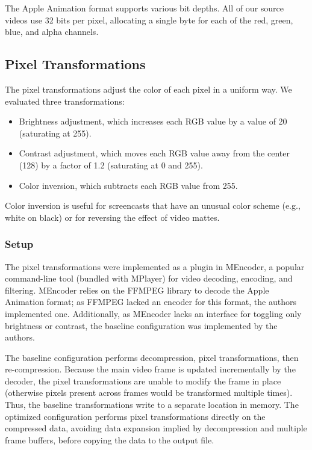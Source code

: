 The Apple Animation format supports various bit depths.  All of our
source videos use 32 bits per pixel, allocating a single byte for each
of the red, green, blue, and alpha channels.

\subsection{Pixel Transformations}

The pixel transformations adjust the color of each pixel in a uniform
way.  We evaluated three transformations:
\begin{itemize}
\item Brightness adjustment, which increases each RGB value by a value
of 20 (saturating at 255).
\item Contrast adjustment, which moves each RGB value away from the
center (128) by a factor of 1.2 (saturating at 0 and 255).
\item Color inversion, which subtracts each RGB value from 255.
\end{itemize}
Color inversion is useful for screencasts that have an unusual color
scheme (e.g., white on black) or for reversing the effect of video
mattes.

\subsubsection{Setup}

The pixel transformations were implemented as a plugin in MEncoder, a
popular command-line tool (bundled with MPlayer) for video decoding,
encoding, and filtering.  MEncoder relies on the FFMPEG library to
decode the Apple Animation format; as FFMPEG lacked an encoder for
this format, the authors implemented one.  Additionally, as MEncoder
lacks an interface for toggling only brightness or contrast, the
baseline configuration was implemented by the authors.

The baseline configuration performs decompression, pixel
transformations, then re-compression.  Because the main video frame is
updated incrementally by the decoder, the pixel transformations are
unable to modify the frame in place (otherwise pixels present across
frames would be transformed multiple times).  Thus, the baseline
transformations write to a separate location in memory.  The optimized
configuration performs pixel transformations directly on the
compressed data, avoiding data expansion implied by decompression and
multiple frame buffers, before copying the data to the output file.

